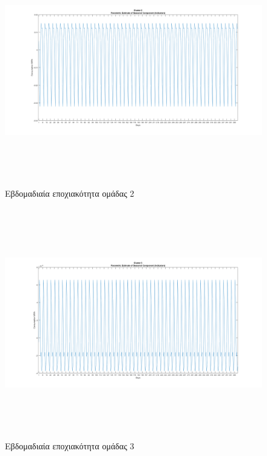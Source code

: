 \documentclass[a4paper, 11pt]{article}
\begin{document}
\begin{figure}[ht!]
\centering
\includegraphics[width=180mm, height=100mm]{../../plots/Trend_estimation/seasonal_2.png}
\caption{Εβδομαδιαία εποχιακότητα ομάδας 2\label{seas2}}
\end{figure}
\begin{figure}[ht!]
\centering
\includegraphics[width=180mm, height=100mm]{../../plots/Trend_estimation/seasonal_3.png}
\caption{Εβδομαδιαία εποχιακότητα ομάδας 3\label{seas3}}
\end{figure}
\end{document}
